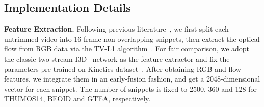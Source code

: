 \documentclass[final]{cvpr}
\begin{document}
\begin{table}[t]
\small
\begin{center}
\caption{Evaluation of core modules on THUMOS14. `Key' indicates whether to detect keypoints. Two location prediction paradigms: frame-level probability and proposal-based prediction are abbreviated as `frame' and `proposal'. AVG is the average mAP at IoU thresholds 0.1:0.1:0.7.
}
\label{tab:mil vs 2dvector}
\end{center}
\end{table}










\subsection{Implementation Details}
\textbf{Feature Extraction.}
Following previous literature~\cite{paul2018w,liu2019completeness,nguyen2019weakly,liu2019weakly}, we first split each untrimmed video into 16-frame non-overlapping snippets, then extract the optical flow from RGB data via the TV-L1 algorithm~\cite{wedel2009improved}. For fair comparison, we adopt the classic two-stream I3D~\cite{carreira2017quo} network as the feature extractor and fix the parameters pre-trained on Kinetics dataset~\cite{carreira2017quo}. After obtaining RGB and flow features, we integrate them in an early-fusion fashion, and get a 2048-dimensional vector for each snippet. The number of snippets  is fixed to 2500, 360 and 128 for THUMOS14, BEOID and GTEA, respectively.
\end{document}
